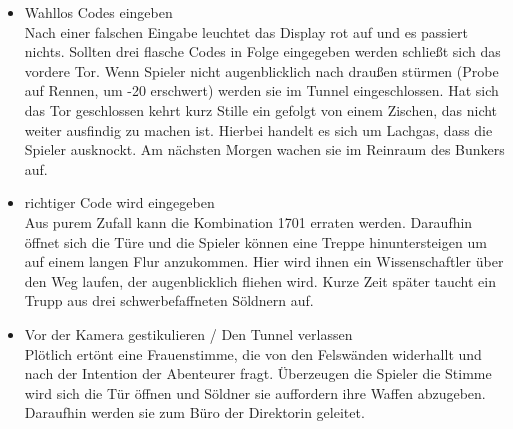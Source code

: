 \begin{itemize}
  \item Wahllos Codes eingeben
  \\Nach einer falschen Eingabe leuchtet das Display rot auf und es passiert nichts. Sollten drei flasche Codes in Folge eingegeben werden schließt sich das vordere Tor.
  Wenn Spieler nicht augenblicklich nach draußen stürmen (Probe auf Rennen, um -20 erschwert) werden sie im Tunnel eingeschlossen.
  Hat sich das Tor geschlossen kehrt kurz Stille ein gefolgt von einem Zischen, das nicht weiter ausfindig zu machen ist.
  Hierbei handelt es sich um Lachgas, dass die Spieler ausknockt. Am nächsten Morgen wachen sie im Reinraum des Bunkers auf.

  \item richtiger Code wird eingegeben
  \\Aus purem Zufall kann die Kombination 1701 erraten werden. Daraufhin öffnet sich die Türe und die Spieler können eine Treppe hinuntersteigen um auf einem langen Flur anzukommen. Hier wird ihnen ein Wissenschaftler über den Weg laufen, der augenblicklich fliehen wird. Kurze Zeit später taucht ein Trupp aus drei schwerbefaffneten Söldnern auf.

  \item Vor der Kamera gestikulieren / Den Tunnel verlassen
  \\Plötlich ertönt eine Frauenstimme, die von den Felswänden widerhallt und nach der Intention der Abenteurer fragt. Überzeugen die Spieler die Stimme wird sich die Tür öffnen und Söldner sie auffordern ihre Waffen abzugeben. Daraufhin werden sie zum Büro der Direktorin geleitet.
\end{itemize}
